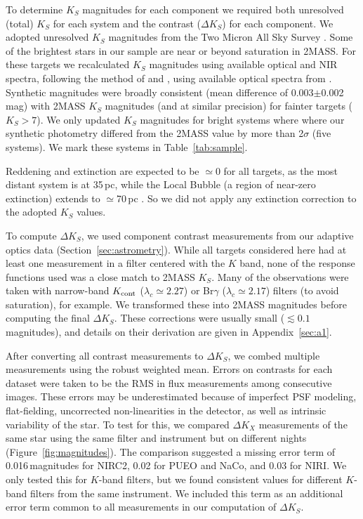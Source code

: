 \documentclass[twocolumn]{aastex62}
\begin{document}
To determine $K_S$ magnitudes for each component we required both unresolved (total) $K_S$ for each system and the contrast ($\Delta K_S$) for each component. We adopted unresolved $K_S$ magnitudes from the Two Micron All Sky Survey \citep[2MASS,][]{Skrutskie2006}. Some of the brightest stars in our sample are near or beyond saturation in 2MASS. For these targets we recalculated $K_S$ magnitudes using available optical and NIR spectra, following the method of \citet{Mann2015a} and \citet{Mann2015b}, using available optical spectra from \citet{Gaidos2014}. Synthetic magnitudes were broadly consistent (mean difference of 0.003$\pm$0.002\,mag) with 2MASS $K_S$ magnitudes (and at similar precision) for fainter targets ($K_S>7$). We only updated $K_S$ magnitudes for bright systems where where our synthetic photometry differed from the 2MASS value by more than 2$\sigma$ (five systems). We mark these systems in Table~\ref{tab:sample}. 

Reddening and extinction are expected to be $\simeq$0 for all targets, as the most distant system is at 35\,pc, while the Local Bubble (a region of near-zero extinction) extends to $\simeq$70\,pc \citep{2009MNRAS.397.1286A}. So we did not apply any extinction correction to the adopted $K_S$ values.

To compute $\Delta K_S$, we used component contrast measurements from our adaptive optics data (Section~\ref{sec:astrometry}). While all targets considered here had at least one measurement in a filter centered with the $K$ band, none of the response functions used was a close match to 2MASS $K_S$. Many of the observations were taken with narrow-band $K_{\rm{cont}}$ ($\lambda_c\simeq2.27$\um) or Br$\gamma$ ($\lambda_c\simeq2.17$\um) filters (to avoid saturation), for example. We transformed these into 2MASS magnitudes before computing the final $\Delta K_S$. These corrections were usually small ($\lesssim0.1$ magnitudes), and details on their derivation are given in Appendix~\ref{sec:a1}.

After converting all contrast measurements to $\Delta K_S$, we combed multiple measurements using the robust weighted mean. Errors on contrasts for each dataset were taken to be the RMS in flux measurements among consecutive images. These errors may be underestimated because of imperfect PSF modeling, flat-fielding, uncorrected non-linearities in the detector, as well as intrinsic variability of the star. To test for this, we compared $\Delta K_X$ measurements of the same star using the same filter and instrument but on different nights (Figure~\ref{fig:magnitudes}). The comparison suggested a missing error term of 0.016\,magnitudes for NIRC2, 0.02 for PUEO and NaCo, and 0.03 for NIRI. We only tested this for $K$-band filters, but we found consistent values for different $K$-band filters from the same instrument. We included this term as an additional error term common to all measurements in our computation of $\Delta K_S$.
\end{document}
